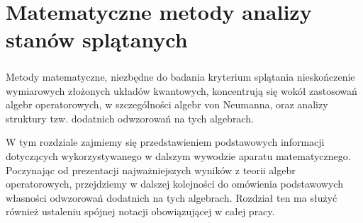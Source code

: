 \chapter{Matematyczne metody analizy stanów splątanych}
\label{chp:preliminaries}

\paragraph{}
Metody matematyczne,
niezbędne do badania kryterium splątania nieskończenie wymiarowych złożonych
układów kwantowych, koncentrują się wokół zastosowań algebr operatorowych,
w szczególności algebr von Neumanna,
oraz analizy struktury tzw. dodatnich odwzorowań na tych algebrach.

W tym rozdziale zajmiemy się przedstawieniem podstawowych informacji dotyczących
wykorzystywanego w dalszym wywodzie aparatu matematycznego.
Poczynając od prezentacji najważniejszych wyników z teorii algebr operatorowych,
przejdziemy w dalszej kolejności do omówienia podstawowych własności
odwzorowań dodatnich na tych algebrach.
Rozdział ten ma służyć również ustaleniu spójnej
notacji obowiązującej w całej pracy.

